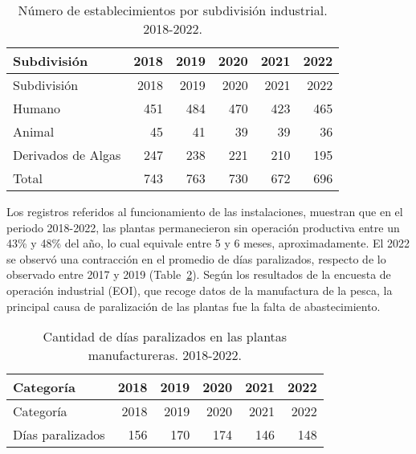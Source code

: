 \documentclass[
  super,
  preprint,
  3p]{elsarticle}
\begin{document}
\hypertarget{tbl-c}{}
\begin{longtable}[]{@{}lrrrrr@{}}
\caption{\label{tbl-c}Número de establecimientos por subdivisión
industrial. 2018-2022.}\tabularnewline
\toprule\noalign{}
Subdivisión & 2018 & 2019 & 2020 & 2021 & 2022 \\
\midrule\noalign{}
\endfirsthead
\toprule\noalign{}
Subdivisión & 2018 & 2019 & 2020 & 2021 & 2022 \\
\midrule\noalign{}
\endhead
\bottomrule\noalign{}
\endlastfoot
Humano & 451 & 484 & 470 & 423 & 465 \\
Animal & 45 & 41 & 39 & 39 & 36 \\
Derivados de Algas & 247 & 238 & 221 & 210 & 195 \\
Total & 743 & 763 & 730 & 672 & 696 \\
\end{longtable}

Los registros referidos al funcionamiento de las instalaciones, muestran
que en el periodo 2018-2022, las plantas permanecieron sin operación
productiva entre un 43\% y 48\% del año, lo cual equivale entre 5 y 6
meses, aproximadamente. El 2022 se observó una contracción en el
promedio de días paralizados, respecto de lo observado entre 2017 y 2019
(Table~\ref{tbl-d}). Según los resultados de la encuesta de operación
industrial (EOI), que recoge datos de la manufactura de la pesca, la
principal causa de paralización de las plantas fue la falta de
abastecimiento.

\hypertarget{tbl-d}{}
\begin{longtable}[]{@{}lrrrrr@{}}
\caption{\label{tbl-d}Cantidad de días paralizados en las plantas
manufactureras. 2018-2022.}\tabularnewline
\toprule\noalign{}
Categoría & 2018 & 2019 & 2020 & 2021 & 2022 \\
\midrule\noalign{}
\endfirsthead
\toprule\noalign{}
Categoría & 2018 & 2019 & 2020 & 2021 & 2022 \\
\midrule\noalign{}
\endhead
\bottomrule\noalign{}
\endlastfoot
Días paralizados & 156 & 170 & 174 & 146 & 148 \\
\end{longtable}


\renewcommand\refname{References}
  
\end{document}
